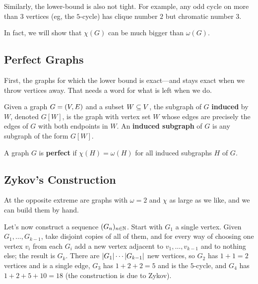 Similarly, the lower-bound is also not tight. For example, any odd cycle on more than $3$ vertices (eg, the $5$-cycle) has clique number $2$ but chromatic number $3$.

\begin{figure}[H]
    \centering
\end{figure}

In fact, we will show that $\chi(G)$ can be much bigger than $\omega(G)$.

\subsection{Perfect Graphs}

First, the graphs for which the lower bound is exact---and stays exact when we throw vertices away. That needs a word for what is left when we do.

\begin{boxdefinition}
    Given a graph $G = \left( V, E \right)$ and a subset $W \subseteq V$, the subgraph of $G$ \textbf{induced} by $W$, denoted $G[W]$, is the graph with vertex set $W$ whose edges are precisely the edges of $G$ with both endpoints in $W$. An \textbf{induced subgraph} of $G$ is any subgraph of the form $G[W]$.
\end{boxdefinition}

\begin{boxdefinition}
    A graph $G$ is \textbf{perfect} if $\chi(H) = \omega(H)$ for all induced subgraphs $H$ of $G$.
\end{boxdefinition}

\subsection{Zykov's Construction}

At the opposite extreme are graphs with $\omega = 2$ and $\chi$ as large as we like, and we can build them by hand.

Let's now construct a sequence $(G_n)_{n \in \mathbb{N}}$. Start with $G_1$ a single vertex. Given $G_1, \ldots, G_{k-1}$, take disjoint copies of all of them, and for every way of choosing one vertex $v_i$ from each $G_i$ add a new vertex adjacent to $v_1, \ldots, v_{k-1}$ and to nothing else; the result is $G_k$. There are $\left\lvert G_1 \right\rvert \cdots \left\lvert G_{k-1} \right\rvert$ new vertices, so $G_2$ has $1 + 1 = 2$ vertices and is a single edge, $G_3$ has $1 + 2 + 2 = 5$ and is the $5$-cycle, and $G_4$ has $1 + 2 + 5 + 10 = 18$ (the construction is due to Zykov).

